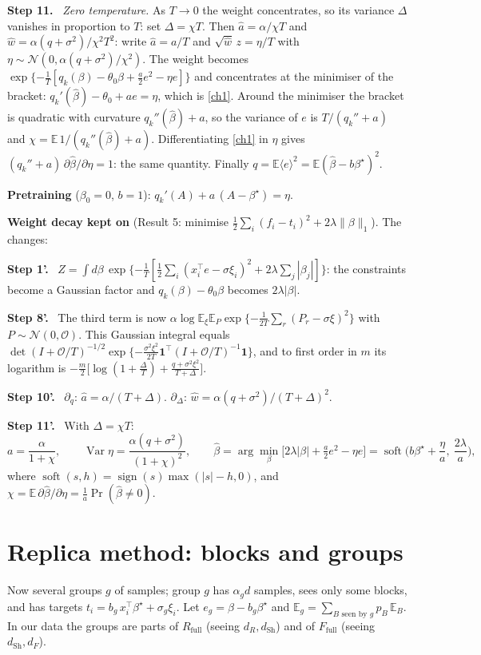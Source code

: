 \documentclass[10pt]{article}
\newcommand{\bs}{\beta^\star}\newcommand{\E}{\mathbb E}\newcommand{\asinh}{\operatorname{arcsinh}}\newcommand{\sk}{\sqrt k}
\newcommand{\Rf}{R_{\mathrm{full}}}\newcommand{\Ff}{F_{\mathrm{full}}}\newcommand{\dSh}{d_{\mathrm{Sh}}}
\newcommand{\step}[1]{\par\smallskip\textbf{Step #1.}\ }
\begin{document}
\step{11} \emph{Zero temperature.} As $T\to0$ the weight concentrates, so its variance $\Delta$ vanishes in proportion to $T$: set $\Delta=\chi T$. Then $\hat a=\alpha/\chi T$ and $\hat w=\alpha(q+\sigma^2)/\chi^2T^2$: write $\hat a=a/T$ and $\sqrt{\hat w}\,z=\eta/T$ with $\eta\sim\mathcal N(0,\alpha(q+\sigma^2)/\chi^2)$. The weight becomes $\exp\{-\frac1T[q_k(\beta)-\theta_0\beta+\frac a2e^2-\eta e]\}$ and concentrates at the minimiser of the bracket: $q_k'(\hat\beta)-\theta_0+ae=\eta$, which is \eqref{ch1}. Around the minimiser the bracket is quadratic with curvature $q_k''(\hat\beta)+a$, so the variance of $e$ is $T/(q_k''+a)$ and $\chi=\E\,1/(q_k''(\hat\beta)+a)$. Differentiating \eqref{ch1} in $\eta$ gives $(q_k''+a)\,\partial\hat\beta/\partial\eta=1$: the same quantity. Finally $q=\E\langle e\rangle^2=\E(\hat\beta-b\bs)^2$.

\textbf{Pretraining} ($\beta_0=0$, $b=1$): $q_k'(A)+a\,(A-\bs)=\eta$.

\textbf{Weight decay kept on} (Result 5: minimise $\frac12\sum_i(f_i-t_i)^2+2\lambda\|\beta\|_1$). The changes:
\step{1'} $Z=\int d\beta\,\exp\{-\frac1T[\frac12\sum_i(x_i^\top e-\sigma\xi_i)^2+2\lambda\sum_j|\beta_j|]\}$: the constraints become a Gaussian factor and $q_k(\beta)-\theta_0\beta$ becomes $2\lambda|\beta|$.
\step{8'} The third term is now $\alpha\log\E_\xi\E_P\exp\{-\frac1{2T}\sum_r(P_r-\sigma\xi)^2\}$ with $P\sim\mathcal N(0,\mathcal O)$. This Gaussian integral equals $\det(I+\mathcal O/T)^{-1/2}\exp\{-\frac{\sigma^2\xi^2}{2T}\mathbf 1^\top(I+\mathcal O/T)^{-1}\mathbf 1\}$, and to first order in $m$ its logarithm is $-\frac m2\big[\log(1+\frac\Delta T)+\frac{q+\sigma^2\xi^2}{T+\Delta}\big]$.
\step{10'} $\partial_q$: $\hat a=\alpha/(T+\Delta)$. $\partial_\Delta$: $\hat w=\alpha(q+\sigma^2)/(T+\Delta)^2$.
\step{11'} With $\Delta=\chi T$:
\[
a=\frac{\alpha}{1+\chi},\qquad\operatorname{Var}\eta=\frac{\alpha(q+\sigma^2)}{(1+\chi)^2},\qquad\hat\beta=\arg\min_\beta\big[2\lambda|\beta|+\tfrac a2e^2-\eta e\big]=\operatorname{soft}\Big(b\bs+\frac\eta a,\ \frac{2\lambda}a\Big),
\]
where $\operatorname{soft}(s,h)=\operatorname{sign}(s)\max(|s|-h,0)$, and $\chi=\E\,\partial\hat\beta/\partial\eta=\frac1a\Pr(\hat\beta\neq0)$.

\section{Replica method: blocks and groups}\label{sec:blocks}
Now several groups $g$ of samples; group $g$ has $\alpha_gd$ samples, sees only some blocks, and has targets $t_i=b_g\,x_i^\top\bs+\sigma_g\xi_i$. Let $e_g=\beta-b_g\bs$ and $\E_g=\sum_{B\text{ seen by }g}p_B\,\E_B$. In our data the groups are parts of $\Rf$ (seeing $d_R,\dSh$) and of $\Ff$ (seeing $\dSh,d_F$).
\end{document}
